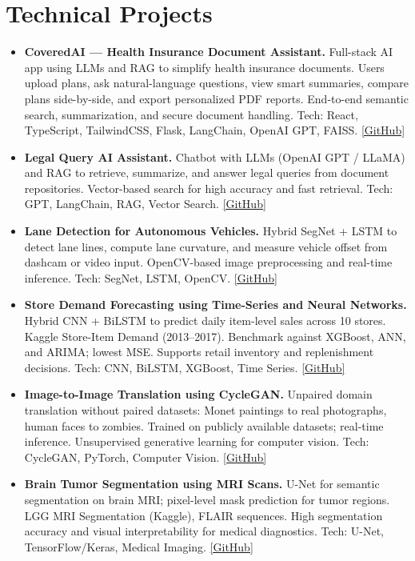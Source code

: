 \documentclass[11pt,a4paper]{article}
\newcommand{\cvItem}[1]{\item \small #1 \vspace{-1pt}}
\begin{document}
\section{Technical Projects}

\begin{itemize}[leftmargin=*,nosep]
  \cvItem{\textbf{CoveredAI --- Health Insurance Document Assistant.} Full-stack AI app using LLMs and RAG to simplify health insurance documents. Users upload plans, ask natural-language questions, view smart summaries, compare plans side-by-side, and export personalized PDF reports. End-to-end semantic search, summarization, and secure document handling. Tech: React, TypeScript, TailwindCSS, Flask, LangChain, OpenAI GPT, FAISS. \href{https://github.com/aravinda-1402/coveredai-healthclaim-rag-agent}{[GitHub]}}
  \cvItem{\textbf{Legal Query AI Assistant.} Chatbot with LLMs (OpenAI GPT / LLaMA) and RAG to retrieve, summarize, and answer legal queries from document repositories. Vector-based search for high accuracy and fast retrieval. Tech: GPT, LangChain, RAG, Vector Search. \href{https://github.com/aravinda-1402/Legal-Query-AI-Assistant}{[GitHub]}}
  \cvItem{\textbf{Lane Detection for Autonomous Vehicles.} Hybrid SegNet + LSTM to detect lane lines, compute lane curvature, and measure vehicle offset from dashcam or video input. OpenCV-based image preprocessing and real-time inference. Tech: SegNet, LSTM, OpenCV. \href{https://github.com/aravinda-1402/Lane-Detection-for-Autonomous-Vehicles}{[GitHub]}}
  \cvItem{\textbf{Store Demand Forecasting using Time-Series and Neural Networks.} Hybrid CNN + BiLSTM to predict daily item-level sales across 10 stores. Kaggle Store-Item Demand (2013--2017). Benchmark against XGBoost, ANN, and ARIMA; lowest MSE. Supports retail inventory and replenishment decisions. Tech: CNN, BiLSTM, XGBoost, Time Series. \href{https://github.com/aravinda-1402/Store-Demand-Forecasting-using-Time-Series-and-Neural-Networks}{[GitHub]}}
  \cvItem{\textbf{Image-to-Image Translation using CycleGAN.} Unpaired domain translation without paired datasets: Monet paintings to real photographs, human faces to zombies. Trained on publicly available datasets; real-time inference. Unsupervised generative learning for computer vision. Tech: CycleGAN, PyTorch, Computer Vision. \href{https://github.com/aravinda-1402/CycleGAN-for-Image-Translation}{[GitHub]}}
  \cvItem{\textbf{Brain Tumor Segmentation using MRI Scans.} U-Net for semantic segmentation on brain MRI; pixel-level mask prediction for tumor regions. LGG MRI Segmentation (Kaggle), FLAIR sequences. High segmentation accuracy and visual interpretability for medical diagnostics. Tech: U-Net, TensorFlow/Keras, Medical Imaging. \href{https://github.com/aravinda-1402/Brain-MRI-Classification-Segmentation}{[GitHub]}}

\end{itemize}
\end{document}
